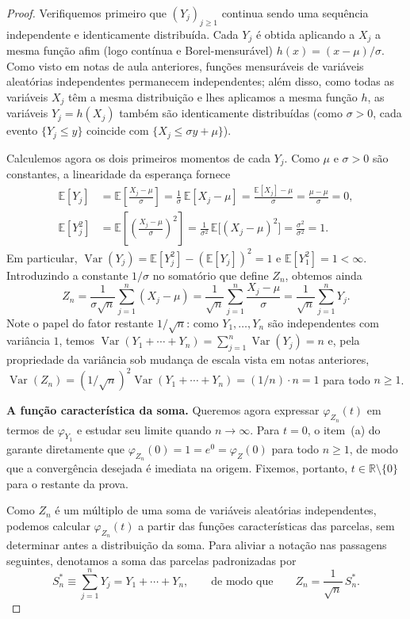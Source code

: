 \documentclass[12pt,portuguese]{article}
\theoremstyle{definition}
\theoremstyle{plainexercise}
\theoremstyle{starredexercise}
\theoremstyle{definition}
\begin{document}
\begin{proof}
Verifiquemos primeiro que $(Y_j)_{j\geqslant1}$ continua sendo uma
sequência independente e identicamente distribuída. Cada $Y_j$ é obtida
aplicando a $X_j$ a mesma função afim (logo contínua e Borel-mensurável)
$h(x)=(x-\mu)/\sigma$. Como visto em notas de aula anteriores, funções
mensuráveis de variáveis aleatórias independentes permanecem independentes;
além disso, como todas as variáveis $X_j$ têm a mesma distribuição e lhes
aplicamos a mesma função $h$, as variáveis $Y_j=h(X_j)$ também são
identicamente distribuídas (como $\sigma>0$, cada evento
$\{Y_j\leqslant y\}$ coincide com $\{X_j\leqslant\sigma y+\mu\}$).

Calculemos agora os dois primeiros momentos de cada $Y_j$. Como $\mu$ e
$\sigma>0$ são constantes, a linearidade da esperança fornece
\begin{align*}
\mathbb{E}[Y_j]
&=\mathbb{E}\!\left[\frac{X_j-\mu}{\sigma}\right]
=\frac{1}{\sigma}\,\mathbb{E}[X_j-\mu]
=\frac{\mathbb{E}[X_j]-\mu}{\sigma}
=\frac{\mu-\mu}{\sigma}
=0,
\\[0.3cm]
\mathbb{E}[Y_j^2]
&=\mathbb{E}\!\left[\left(\frac{X_j-\mu}{\sigma}\right)^{\!2}\right]
=\frac{1}{\sigma^2}\,\mathbb{E}\bigl[(X_j-\mu)^2\bigr]
=\frac{\sigma^2}{\sigma^2}
=1.
\end{align*}
Em particular, $\operatorname{Var}(Y_j)=\mathbb{E}[Y_j^2]-(\mathbb{E}[Y_j])^2=1$
e $\mathbb{E}[Y_1^2]=1<\infty$. Introduzindo a constante $1/\sigma$ no
somatório que define $Z_n$, obtemos ainda
\[
Z_n
=\frac{1}{\sigma\sqrt{n}}\sum_{j=1}^n(X_j-\mu)
=\frac{1}{\sqrt{n}}\sum_{j=1}^n\frac{X_j-\mu}{\sigma}
=\frac{1}{\sqrt{n}}\sum_{j=1}^n Y_j.
\]
Note o papel do fator restante $1/\sqrt{n}$: como $Y_1,\ldots,Y_n$ são
independentes com variância $1$, temos
$\operatorname{Var}(Y_1+\cdots+Y_n)=\sum_{j=1}^n\operatorname{Var}(Y_j)=n$
e, pela propriedade da variância sob mudança de escala vista em notas
anteriores,
$\operatorname{Var}(Z_n)=(1/\sqrt{n})^2\operatorname{Var}(Y_1+\cdots+Y_n)=(1/n)\cdot n=1$
para todo $n\geqslant1$.

\smallskip
\noindent\textbf{A função característica da soma.}
Queremos agora expressar $\varphi_{Z_n}(t)$ em termos de $\varphi_{Y_1}$ e
estudar seu limite quando $n\to\infty$. Para $t=0$, o item~(a) do
 garante diretamente que
$\varphi_{Z_n}(0)=1=e^0=\varphi_Z(0)$ para todo $n\geqslant1$, de modo que a
convergência desejada é imediata na origem. Fixemos, portanto,
$t\in\mathbb{R}\setminus\{0\}$ para o restante da prova.

Como $Z_n$ é um múltiplo de uma soma de variáveis aleatórias independentes,
podemos calcular $\varphi_{Z_n}(t)$ a partir das funções características
das parcelas, sem determinar antes a distribuição da soma. Para aliviar a
notação nas passagens seguintes, denotamos a soma das parcelas
padronizadas por
\[
S_n^*\equiv\sum_{j=1}^n Y_j=Y_1+\cdots+Y_n,
\qquad\text{de modo que}\qquad
Z_n=\frac{1}{\sqrt{n}}\,S_n^*.
\]


\end{proof}
\end{document}
